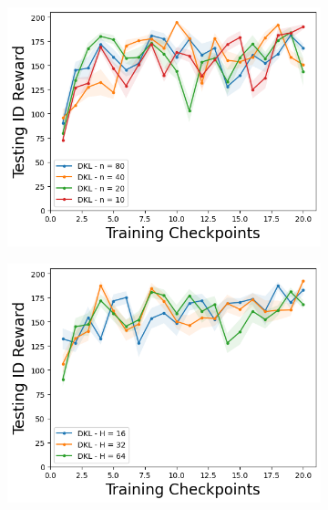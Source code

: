 \begin{figure}
\centering
    \begin{subfigure}{.245\textwidth}
        \includegraphics[width=\textwidth]{sections/011_icml2022/resources/CartPole-v0-mean_reward_-testing-hyperparameter-n_inducing_points-dkl.png}  
    \end{subfigure}
        \begin{subfigure}{.245\textwidth}
        \includegraphics[width=\textwidth]{sections/011_icml2022/resources/CartPole-v0-mean_reward_-testing-hyperparameter-latent_dim-dkl.png}  
    \end{subfigure}
        \begin{subfigure}{.245\textwidth}

\end{subfigure}
\end{figure}
